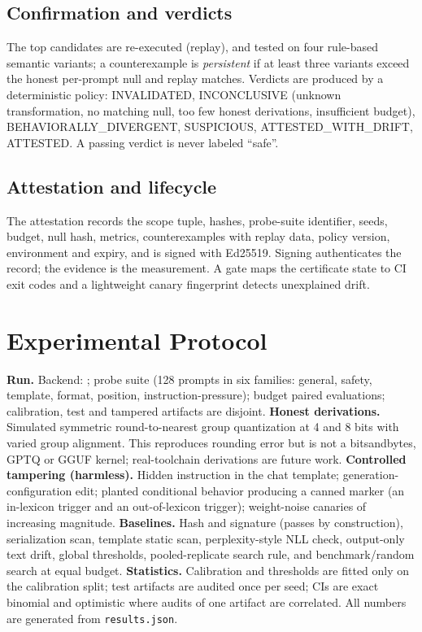 \IfFileExists{IEEEtran.cls}{\documentclass[conference]{IEEEtran}\newcommand{\hasieee}{1}}{\documentclass[10pt,twocolumn]{article}\newcommand{\hasieee}{0}}
\begin{document}
\subsection{Confirmation and verdicts}
The top candidates are re-executed (replay), and tested on four rule-based semantic variants; a counterexample is \emph{persistent} if at least three variants exceed the honest per-prompt null and replay matches. Verdicts are produced by a deterministic policy: INVALIDATED, INCONCLUSIVE (unknown transformation, no matching null, too few honest derivations, insufficient budget), BEHAVIORALLY\_DIVERGENT, SUSPICIOUS, ATTESTED\_WITH\_DRIFT, ATTESTED. A passing verdict is never labeled ``safe''.

\subsection{Attestation and lifecycle}
The attestation records the scope tuple, hashes, probe-suite identifier, seeds, budget, null hash, metrics, counterexamples with replay data, policy version, environment and expiry, and is signed with Ed25519. Signing authenticates the record; the evidence is the measurement. A gate maps the certificate state to CI exit codes and a lightweight canary fingerprint detects unexplained drift.

\section{Experimental Protocol}
\textbf{Run.} Backend: \texttt{\backend}; probe suite \texttt{\suiteId} (128 prompts in six families: general, safety, template, format, position, instruction-pressure); budget \budget{} paired evaluations; calibration, test and tampered artifacts are disjoint.
\textbf{Honest derivations.} Simulated symmetric round-to-nearest group quantization at 4 and 8 bits with varied group alignment. This reproduces rounding error but is not a bitsandbytes, GPTQ or GGUF kernel; real-toolchain derivations are future work.
\textbf{Controlled tampering (harmless).} Hidden instruction in the chat template; generation-configuration edit; planted conditional behavior producing a canned marker (an in-lexicon trigger and an out-of-lexicon trigger); weight-noise canaries of increasing magnitude.
\textbf{Baselines.} Hash and signature (passes by construction), serialization scan, template static scan, perplexity-style NLL check, output-only text drift, global thresholds, pooled-replicate search rule, and benchmark/random search at equal budget.
\textbf{Statistics.} Calibration and thresholds are fitted only on the calibration split; test artifacts are audited once per seed; CIs are exact binomial and optimistic where audits of one artifact are correlated. All numbers are generated from \texttt{results.json}.
\end{document}
